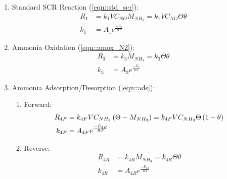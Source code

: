 \begin{enumerate}
\item Standard SCR Reaction (\ref{eqn::std_scr}):
\begin{align*}
    R_1 &= k_1 V C_{NO} M_{NH_3} = k_1V C_{NO} \Theta \theta\\
    k_1 &= A_1 e^{\frac{-E_1}{RT}}
\end{align*}

\item Ammonia Oxidation (\ref{eqn::amox_N2}):
\begin{align*}
    R_3 &= k_3 M_{NH_3} = k_3 \Theta \theta\\
    k_3 &= A_3 e^{\frac{-E_3}{RT}}
\end{align*}

\item Ammonia Adsorption/Desorption (\ref{eqn::ads}):
\begin{enumerate}
\item Forward:
\begin{align*}
    R_{4F} &= k_{4F} V C_{NH_3} \left( \Theta - M_{NH_3} \right)
            = k_{4F} V C_{NH_3} \Theta \left( 1 - \theta \right)\\
    k_{4F} &= A_{4F} e^{\frac{-E_{4F}}{RT}}
\end{align*}

\item Reverse:
\begin{align*}
    R_{4R} &= k_{4R} M_{NH_3}
            = k_{4R} \Theta \theta \\
    k_{4R} &= A_{4R} e^{\frac{-E_{4R}}{RT}}
\end{align*}
\end{enumerate}
\end{enumerate}

